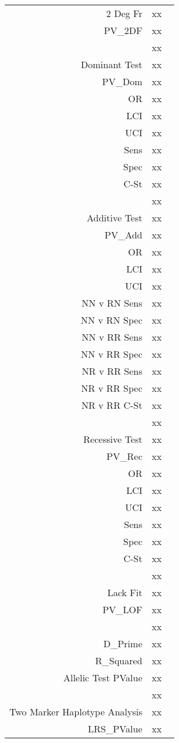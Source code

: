 \begin{supertabular}{r p{5in}}
  2 Deg Fr & xx ~ \\
    PV\_2DF  & xx  \\
  ~ & xx ~ \\
  Dominant Test & xx ~ \\
    PV\_Dom  & xx  \\
    OR  & xx  \\
    LCI  & xx  \\
    UCI  & xx  \\
    Sens  & xx  \\
    Spec  & xx  \\
   C-St  & xx  \\
  ~ & xx ~ \\
  Additive Test & xx ~ \\
    PV\_Add  & xx  \\
    OR  & xx  \\
    LCI  & xx  \\
    UCI  & xx  \\
    NN v RN Sens  & xx  \\
    NN v RN Spec  & xx  \\
    NN v RR Sens  & xx  \\
    NN v RR Spec  & xx  \\
    NR v RR Sens  & xx  \\
    NR v RR Spec  & xx  \\
    NR v RR C-St  & xx  \\
  ~ & xx ~ \\
  Recessive Test & xx ~ \\
    PV\_Rec  & xx  \\
    OR  & xx  \\
    LCI  & xx  \\
    UCI  & xx  \\
    Sens  & xx  \\
    Spec  & xx  \\
    C-St  & xx  \\
  ~ & xx ~ \\
  Lack Fit & xx ~ \\
    PV\_LOF  & xx  \\
  ~ & xx ~ \\
    D\_Prime  & xx  \\
    R\_Squared  & xx  \\
    Allelic Test PValue  & xx  \\
  ~ & xx ~ \\
  Two Marker Haplotype Analysis & xx ~ \\
    LRS\_PValue  & xx  \\

\end{supertabular}

